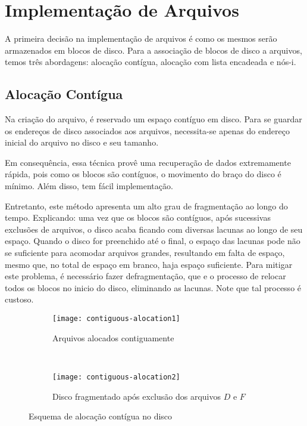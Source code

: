 \section{Implementação de Arquivos}
A primeira decisão na implementação de arquivos é como os mesmos serão armazenados em blocos de disco. Para a associação de blocos de disco a arquivos, temos três abordagens: alocação contígua, alocação com lista encadeada e nós-i.





\subsection{Alocação Contígua}
Na criação do arquivo, é reservado um espaço contíguo em disco. Para se guardar os endereços de disco associados aos arquivos, necessita-se apenas do endereço inicial do arquivo no disco e seu tamanho.

Em consequência, essa técnica provê uma recuperação de dados extremamente rápida, pois como os blocos são contíguos, o movimento do braço do disco é mínimo. Além disso, tem fácil implementação.

Entretanto, este método apresenta um alto grau de fragmentação ao longo do tempo. Explicando: uma vez que os blocos são contíguos, após sucessivas exclusões de arquivos, o disco acaba ficando com diversas lacunas ao longo de seu espaço. Quando o disco for preenchido até o final, o espaço das lacunas pode não se suficiente para acomodar arquivos grandes, resultando em falta de espaço, mesmo que, no total de espaço em branco, haja espaço suficiente. Para mitigar este problema, é necessário fazer defragmentação, que e o processo de relocar todos os blocos no inicio do disco, eliminando as lacunas. Note que tal processo é custoso.

\begin{figure*}[h]
  \begin{subfigure}{\textwidth}
    \centering
    \texttt{[image: contiguous-alocation1]}
    \caption{Arquivos alocados contiguamente}
  \end{subfigure}
  ~
  \begin{subfigure}{\textwidth}
    \centering
    \texttt{[image: contiguous-alocation2]}
    \caption{Disco fragmentado após exclusão dos arquivos $D$ e $F$}
  \end{subfigure}

  \caption{Esquema de alocação contígua no disco}
  \label{fig:contiguous-allocation}
\end{figure*}

